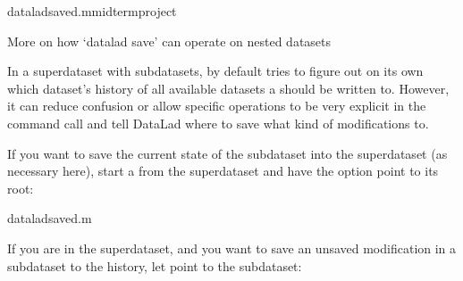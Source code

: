 \begin{sphinxVerbatim}[commandchars=\\\{\}]
dataladsave\PYGZhy{}d.\PYGZhy{}mmidterm\PYGZus{}project
\end{sphinxVerbatim}

\ignorespaces \begin{findoutmore}[label={index-1}, before title={\thetcbcounter\ }, check odd page=true]{More on how ‘datalad save’ can operate on nested datasets}
\label{\detokenize{basics/101-132-advancednesting:index-1}}

\sphinxAtStartPar
In a superdataset with subdatasets,  by default
tries to figure out on its own which dataset’s history of all available
datasets a  should be written to. However, it can reduce
confusion or allow specific operations to be very explicit in the command
call and tell DataLad where to save what kind of modifications to.

\sphinxAtStartPar
If you want to save the current state of the subdataset into the superdataset
(as necessary here), start a  from the superdataset and have the
 option point to its root:

\begin{sphinxVerbatim}[commandchars=\\\{\}]
dataladsave\PYGZhy{}d.\PYGZhy{}m
\end{sphinxVerbatim}

\sphinxAtStartPar
If you are in the superdataset, and you want to save an unsaved modification
in a subdataset to the  history, let  point to
the subdataset:


\end{findoutmore}
